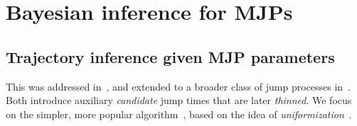 \section{Bayesian inference for MJPs}
\subsection{Trajectory inference given MJP parameters}
This was addressed in~\cite{RaoTeh13}, and extended to a broader class of 
jump processes %
in~\cite{RaoTeh12}. %
Both introduce auxiliary 
{\em candidate} jump times that are later {\em thinned}.  We focus on 
the simpler, more popular {\algname} algorithm~\cite{RaoTeh13},
based on the idea of {\em uniformization}~\cite{Jen1953}. 

